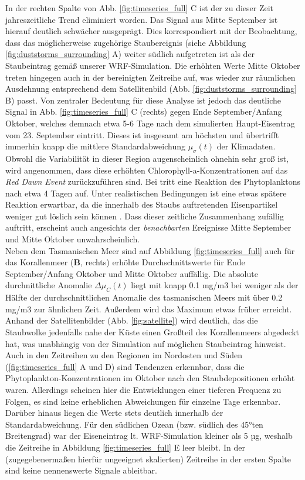 \documentclass[12pt,a4paper,onecolumn,draft]{scrartcl}
\begin{document}
In der rechten Spalte von Abb. \ref{fig:timeseries_full} C ist der zu dieser Zeit jahreszeitliche Trend eliminiert worden. Das Signal aus Mitte September ist hierauf deutlich schwächer ausgeprägt. Dies korrespondiert mit der Beobachtung, dass das möglicherweise zugehörige Staubereignis (siehe Abbildung \ref{fig:duststorms_surrounding} A) weiter südlich aufgetreten ist als der Staubeintrag gemäß unserer WRF-Simulation. Die erhöhten Werte Mitte Oktober treten hingegen auch in der bereinigten Zeitreihe auf, was wieder zur räumlichen Ausdehnung entsprechend dem Satellitenbild (Abb. \ref{fig:duststorms_surrounding} B) passt. Von zentraler Bedeutung für diese Analyse ist jedoch das deutliche Signal in Abb. \ref{fig:timeseries_full} C (rechts) gegen Ende September/Anfang Oktober, welches demnach etwa 5-6 Tage nach dem simulierten Haupt-Eisentrag vom 23. September eintritt. Dieses ist insgesamt am höchsten und übertrifft immerhin knapp die mittlere Standardabweichung $\mu_\sigma(t)$ der Klimadaten. Obwohl die Variabilität in dieser Region augenscheinlich ohnehin sehr groß ist, wird angenommen, dass diese erhöhten Chlorophyll-a-Konzentrationen auf das \textit{Red Dawn Event} zurückzuführen sind. Bei \citet{Martin.1988} tritt eine Reaktion des Phytoplanktons nach etwa 4 Tagen auf. Unter realistischen Bedingungen ist eine etwas spätere Reaktion erwartbar, da die innerhalb des Staubs auftretenden Eisenpartikel weniger gut löslich sein können \citep{Shao.2011}. Dass dieser zeitliche Zusammenhang zufällig auftritt, erscheint auch angesichts der \textit{benachbarten} Ereignisse Mitte September und Mitte Oktober unwahrscheinlich. \\

Neben dem Tasmanischen Meer sind auf Abbildung \ref{fig:timeseries_full} auch für das Korallenmeer (\textbf{B}, rechts) erhöhte Durchschnittswerte für Ende September/Anfang Oktober und Mitte Oktober auffällig. Die absolute durchnittliche Anomalie $\Delta \mu_C(t)$ liegt mit knapp 0.1 mg/m3 bei weniger als der Hälfte der durchschnittlichen Anomalie des tasmanischen Meers mit über 0.2 mg/m3 zur ähnlichen Zeit. Außerdem wird das Maximum etwas früher erreicht. Anhand der Satellitenbilder (Abb. \ref{fig:satellite}) wird deutlich, das die Staubwolke jedenfalls nahe der Küste einen Großteil des Korallenmeers abgedeckt hat, was unabhängig von der Simulation auf möglichen Staubeintrag hinweist. Auch in den Zeitreihen zu den Regionen im Nordosten und Süden (\ref{fig:timeseries_full} A und D) sind Tendenzen erkennbar, dass die Phytoplankton-Konzentrationen im Oktober nach den Staubdepositionen erhöht waren. Allerdings scheinen hier die Entwicklungen einer tieferen Frequenz zu Folgen, es sind keine erheblichen Abweichungen für einzelne Tage erkennbar. Darüber hinaus liegen die Werte stets deutlich innerhalb der Standardabweichung. Für den südlichen Ozean (bzw. südlich des 45°ten Breitengrad) war der Eiseneintrag lt. WRF-Simulation kleiner als 5 µg, weshalb die Zeitreihe in Abbildung \ref{fig:timeseries_full} E leer bleibt. In der (zugegebenermaßen hierfür ungeeignet skalierten) Zeitreihe in der ersten Spalte sind keine nennenswerte Signale ableitbar.
\end{document}
